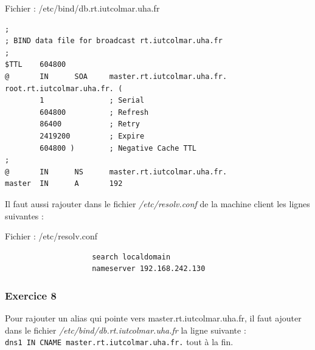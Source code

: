 \documentclass[12pt, a4paper]{article}
\begin{document}
        \begin{listing}[H]
            \caption{Fichier : /etc/bind/db.rt.iutcolmar.uha.fr}
            \label{lst:bind}
            \begin{verbatim}
;
; BIND data file for broadcast rt.iutcolmar.uha.fr
;
$TTL    604800
@       IN      SOA     master.rt.iutcolmar.uha.fr. root.rt.iutcolmar.uha.fr. (
        1               ; Serial
        604800          ; Refresh
        86400           ; Retry
        2419200         ; Expire
        604800 )        ; Negative Cache TTL
;
@       IN      NS      master.rt.iutcolmar.uha.fr.
master  IN      A       192
            \end{verbatim}
        \end{listing}

        Il faut aussi rajouter dans le fichier \textit{/etc/resolv.conf} de la machine
        client les lignes suivantes :

        \begin{listing}[H]
            \caption{Fichier : /etc/resolv.conf}
            \label{lst:resolv}
            \begin{verbatim}
                    search localdomain
                    nameserver 192.168.242.130
            \end{verbatim}
        \end{listing}

        \subsubsection{Exercice 8}
        Pour rajouter un alias qui pointe vers master.rt.iutcolmar.uha.fr, il faut
        ajouter dans le fichier \textit{/etc/bind/db.rt.iutcolmar.uha.fr} la ligne suivante :\\
        \texttt{dns1 IN CNAME master.rt.iutcolmar.uha.fr.} tout à la fin. 

    

        
\end{document}
